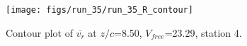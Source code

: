 \begin{figure}[H]
\centering
\texttt{[image: figs/run\_35/run\_35\_R\_contour]}
\caption{Contour plot of $\overline{v_{r}}$ at $z/c$=8.50, $V_{free}$=23.29, station 4.}
\label{fig:run_35_R_contour}
\end{figure}


